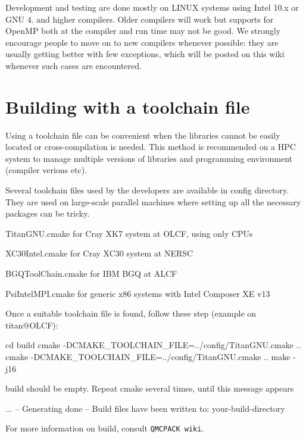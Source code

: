 Development and testing are done mostly on L\-I\-N\-U\-X systems using Intel 10.\-x or G\-N\-U 4. and higher compilers. Older compilers will work but supports for Open\-M\-P both at the compiler and run time may not be good. We strongly encourage people to move on to new compilers whenever possible\-: they are usually getting better with few exceptions, which will be posted on this wiki whenever such cases are encountered.\section{Building with a toolchain file}\label{a00004_toolbuild}
Using a toolchain file can be convenient when the libraries cannot be easily located or cross-\/compilation is needed. This method is recommended on a H\-P\-C system to manage multiple versions of libraries and programming environment (compiler verions etc).

Several toolchain files used by the developers are available in {\ttfamily config} directory. They are used on large-\/scale parallel machines where setting up all the necessary packages can be tricky.
\begin{DoxyItemize}
\item {\ttfamily Titan\-G\-N\-U.\-cmake} for Cray X\-K7 system at O\-L\-C\-F, using only C\-P\-Us
\item {\ttfamily X\-C30\-Intel.\-cmake} for Cray X\-C30 system at N\-E\-R\-S\-C
\item {\ttfamily B\-G\-Q\-Tool\-Chain.\-cmake} for I\-B\-M B\-G\-Q at A\-L\-C\-F
\item {\ttfamily Psi\-Intel\-M\-P\-I.\-cmake} for generic x86 systems with Intel Composer X\-E v13
\end{DoxyItemize}

Once a suitable toolchain file is found, follow these step (example on titan@O\-L\-C\-F)\-: 
\begin{DoxyCode}
cd build
cmake -DCMAKE\_TOOLCHAIN\_FILE=../config/TitanGNU.cmake ..
cmake -DCMAKE\_TOOLCHAIN\_FILE=../config/TitanGNU.cmake ..
make -j16
\end{DoxyCode}
 {\ttfamily build} should be empty. Repeat {\ttfamily cmake} several times, until this message appears 
\begin{DoxyCode}
...
-- Generating done
-- Build files have been written to: your-build-directory
\end{DoxyCode}


For more information on build, consult {\tt Q\-M\-C\-P\-A\-C\-K wiki}. 